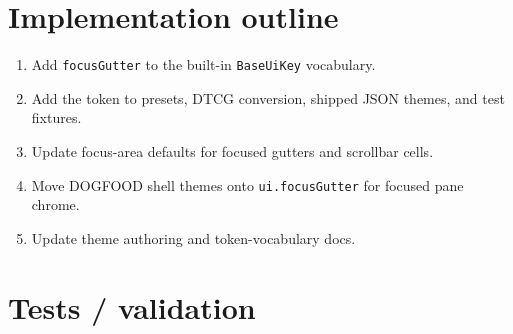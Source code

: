 \section{Implementation outline}\label{record-177-implementation-outline}

\begin{enumerate}
\def\labelenumi{\arabic{enumi}.}
\tightlist
\item
  Add \texttt{f\allowbreak{}o\allowbreak{}c\allowbreak{}u\allowbreak{}s\allowbreak{}G\allowbreak{}u\allowbreak{}t\allowbreak{}t\allowbreak{}e\allowbreak{}r} to the built-in \texttt{B\allowbreak{}a\allowbreak{}s\allowbreak{}e\allowbreak{}U\allowbreak{}i\allowbreak{}K\allowbreak{}e\allowbreak{}y} vocabulary.
\item
  Add the token to presets, DTCG conversion, shipped JSON themes, and test fixtures.
\item
  Update focus-area defaults for focused gutters and scrollbar cells.
\item
  Move DOGFOOD shell themes onto \texttt{u\allowbreak{}i\allowbreak{}.\allowbreak{}f\allowbreak{}o\allowbreak{}c\allowbreak{}u\allowbreak{}s\allowbreak{}G\allowbreak{}u\allowbreak{}t\allowbreak{}t\allowbreak{}e\allowbreak{}r} for focused pane chrome.
\item
  Update theme authoring and token-vocabulary docs.
\end{enumerate}

\section{Tests / validation}\label{record-177-tests-validation}

